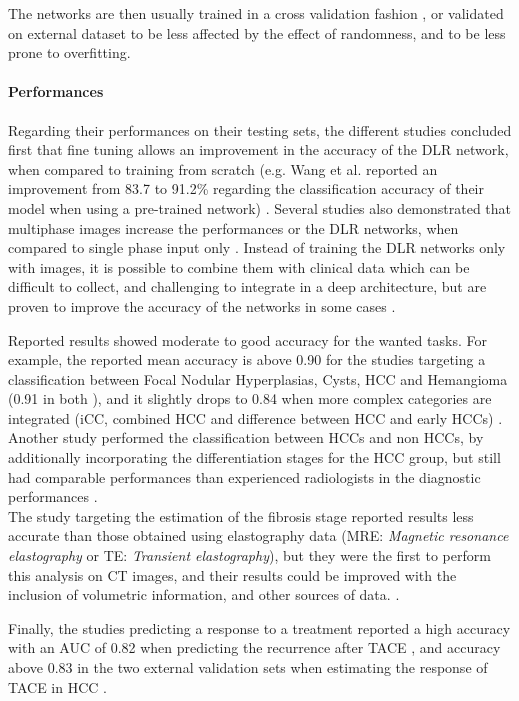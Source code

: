 \documentclass[]{article}
\let\oldparagraph\paragraph
\renewcommand{\paragraph}[1]{\oldparagraph{#1}\mbox{}}
\begin{document}
The networks are then usually trained in a cross validation fashion \cite{Yamada2019,Yasaka2018,Yasaka2018a,WANG2019}, or validated on external dataset \cite{Peng2020} to be less affected by the effect of randomness, and to
be less prone to overfitting.

\paragraph{Performances}\label{performances}

Regarding their performances on their testing sets, the different
studies concluded first that fine tuning allows an improvement in the
accuracy of the DLR network, when compared to training from
scratch (e.g. Wang et al. reported an improvement from 83.7 to 91.2\%
regarding the classification accuracy of their model when using a
pre-trained network) \cite{Wang2018,Yamada2019}. Several studies also demonstrated that multiphase images
increase the performances or the DLR networks, when compared to
single phase input only \cite{Yasaka2018}. Instead of
training the DLR networks only with images, it is possible to
combine them with clinical data which can be difficult to collect, and
challenging to integrate in a deep architecture, but are proven to
improve the accuracy of the networks in some cases \cite{WANG2019}.

Reported results showed moderate to good accuracy for the wanted tasks.
For example, the reported mean accuracy is above 0.90 for the studies
targeting a classification between Focal Nodular Hyperplasias, Cysts,
HCC and Hemangioma (0.91 in both \cite{Liang2018,Wang2018}), and it slightly drops to 0.84 when more complex categories
are integrated (iCC, combined HCC and difference between HCC and early
HCCs) \cite{Yasaka2018a}. Another study performed the
classification between HCCs and non HCCs, by additionally incorporating
the differentiation stages for the HCC group, but still had comparable
performances than experienced radiologists in the diagnostic
performances \cite{Yamada2019}.\\
The study targeting the estimation of the fibrosis stage reported
results less accurate than those obtained using elastography data
(MRE: \emph{Magnetic resonance elastography} or TE: \emph{Transient
elastography}), but they were the first to perform this analysis on CT
images, and their results could be improved with the inclusion of
volumetric information, and other sources of data. \cite{Yasaka2018a}.

Finally, the studies predicting a response to a treatment reported a
high accuracy with an AUC of 0.82 when predicting the recurrence after
TACE \cite{WANG2019}, and accuracy above 0.83 in the two
external validation sets when estimating the response of TACE in HCC
\cite{Peng2020}.
\end{document}
